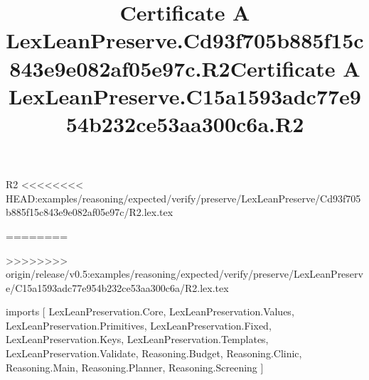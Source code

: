 \begin{lexlean}{R2}
<<<<<<<< HEAD:examples/reasoning/expected/verify/preserve/LexLeanPreserve/Cd93f705b885f15c843e9e082af05e97c/R2.lex.tex
\title{Certificate A LexLeanPreserve.Cd93f705b885f15c843e9e082af05e97c.R2}
========
\title{Certificate A LexLeanPreserve.C15a1593adc77e954b232ce53aa300c6a.R2}
>>>>>>>> origin/release/v0.5:examples/reasoning/expected/verify/preserve/LexLeanPreserve/C15a1593adc77e954b232ce53aa300c6a/R2.lex.tex
\begin{coremodule}
imports [
  LexLeanPreservation.Core,
  LexLeanPreservation.Values,
  LexLeanPreservation.Primitives,
  LexLeanPreservation.Fixed,
  LexLeanPreservation.Keys,
  LexLeanPreservation.Templates,
  LexLeanPreservation.Validate,
  Reasoning.Budget,
  Reasoning.Clinic,
  Reasoning.Main,
  Reasoning.Planner,
  Reasoning.Screening
]


\end{coremodule}
\end{lexlean}
